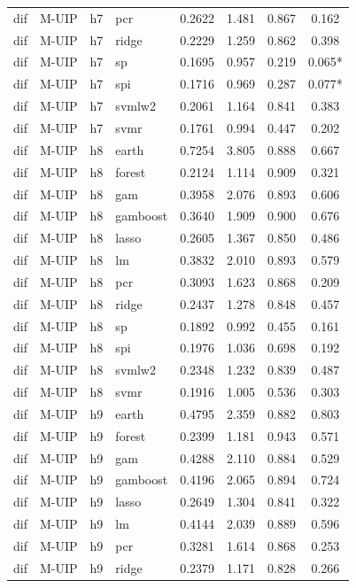 \begin{ThreePartTable}
\begin{longtable}[t]{llclcccc}
dif & M-UIP & h7 & pcr & 0.2622 & 1.481 & 0.867 & 0.162\\
dif & M-UIP & h7 & ridge & 0.2229 & 1.259 & 0.862 & 0.398\\
dif & M-UIP & h7 & sp & 0.1695 & 0.957 & 0.219 & 0.065*\\
dif & M-UIP & h7 & spi & 0.1716 & 0.969 & 0.287 & 0.077*\\
dif & M-UIP & h7 & svmlw2 & 0.2061 & 1.164 & 0.841 & 0.383\\
dif & M-UIP & h7 & svmr & 0.1761 & 0.994 & 0.447 & 0.202\\
\addlinespace
dif & M-UIP & h8 & earth & 0.7254 & 3.805 & 0.888 & 0.667\\
dif & M-UIP & h8 & forest & 0.2124 & 1.114 & 0.909 & 0.321\\
dif & M-UIP & h8 & gam & 0.3958 & 2.076 & 0.893 & 0.606\\
dif & M-UIP & h8 & gamboost & 0.3640 & 1.909 & 0.900 & 0.676\\
dif & M-UIP & h8 & lasso & 0.2605 & 1.367 & 0.850 & 0.486\\
dif & M-UIP & h8 & lm & 0.3832 & 2.010 & 0.893 & 0.579\\
dif & M-UIP & h8 & pcr & 0.3093 & 1.623 & 0.868 & 0.209\\
dif & M-UIP & h8 & ridge & 0.2437 & 1.278 & 0.848 & 0.457\\
dif & M-UIP & h8 & sp & 0.1892 & 0.992 & 0.455 & 0.161\\
dif & M-UIP & h8 & spi & 0.1976 & 1.036 & 0.698 & 0.192\\
dif & M-UIP & h8 & svmlw2 & 0.2348 & 1.232 & 0.839 & 0.487\\
dif & M-UIP & h8 & svmr & 0.1916 & 1.005 & 0.536 & 0.303\\
\addlinespace
dif & M-UIP & h9 & earth & 0.4795 & 2.359 & 0.882 & 0.803\\
dif & M-UIP & h9 & forest & 0.2399 & 1.181 & 0.943 & 0.571\\
dif & M-UIP & h9 & gam & 0.4288 & 2.110 & 0.884 & 0.529\\
dif & M-UIP & h9 & gamboost & 0.4196 & 2.065 & 0.894 & 0.724\\
dif & M-UIP & h9 & lasso & 0.2649 & 1.304 & 0.841 & 0.322\\
dif & M-UIP & h9 & lm & 0.4144 & 2.039 & 0.889 & 0.596\\
dif & M-UIP & h9 & pcr & 0.3281 & 1.614 & 0.868 & 0.253\\
dif & M-UIP & h9 & ridge & 0.2379 & 1.171 & 0.828 & 0.266\\

\end{longtable}
\end{ThreePartTable}

